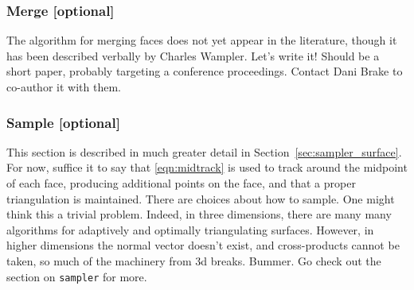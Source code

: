 \subsubsection{Merge [optional]}

The algorithm for merging faces does not yet appear in the literature, though it has been described verbally by Charles Wampler.  Let's write it!  Should be a short paper, probably targeting a conference proceedings.  Contact Dani Brake to co-author it with them.


\subsubsection{Sample [optional]}
This section is described in much greater detail in Section~\ref{sec:sampler_surface}.  For now, suffice it to say that \eqref{eqn:midtrack} is used to track around the midpoint of each face, producing additional points on the face, and that a proper triangulation is maintained.  There are choices about how to sample.  One might think this a trivial problem.  Indeed, in three dimensions, there are many many algorithms for adaptively and optimally triangulating surfaces.  However, in higher dimensions the normal vector doesn't exist, and cross-products cannot be taken, so much of the machinery from 3d breaks.  Bummer.  Go check out the section on {\tt sampler} for more.

